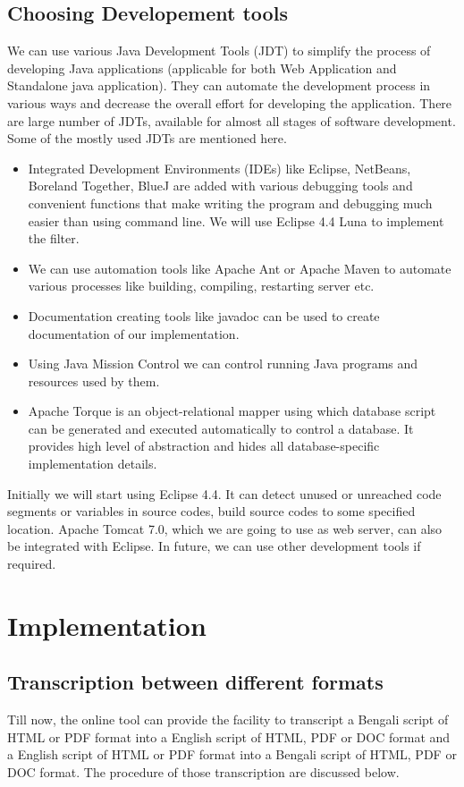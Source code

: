 \documentclass[12pt,oneside,openany,a4paper]{book}
\begin{document}
\section{Choosing Developement tools}
We can use various Java Development Tools (JDT) to simplify the process of developing Java applications (applicable for both Web Application and Standalone java application). They can automate the development process in various ways and decrease the overall effort for developing the application. There are large number of JDTs, available for almost all stages of software development. Some of the mostly used JDTs are mentioned here.
\begin{itemize}
\item	Integrated Development Environments (IDEs) like Eclipse, NetBeans, Boreland Together, BlueJ are added with various debugging tools and convenient functions that make writing the program and debugging much easier than using command line. We will use Eclipse 4.4 Luna to implement the filter.
\item	We can use automation tools like Apache Ant or Apache Maven to automate various processes like building, compiling, restarting server etc.
\item	Documentation creating tools like javadoc can be used to create documentation of our implementation. 
\item  Using Java Mission Control we can control running Java programs and resources used by them.
\item Apache Torque is an object-relational mapper using which database script can be generated and executed automatically to control a database. It provides high level of abstraction and hides all database-specific implementation details.
\end{itemize}

Initially we will start using Eclipse 4.4. It can detect unused or unreached code segments or variables in source codes, build source codes to some specified location. Apache Tomcat 7.0, which we are going to use as web server, can also be integrated with Eclipse. In future, we can use other development tools if required.



\chapter{Implementation}
\label{implementation}

\section{Transcription between different formats}
Till now, the online tool can provide the facility to transcript a Bengali script of HTML or PDF format into a English script of HTML, PDF or DOC format and a English script of HTML or PDF format into a Bengali script of HTML, PDF or DOC format. The procedure of those transcription are discussed below.
\end{document}

